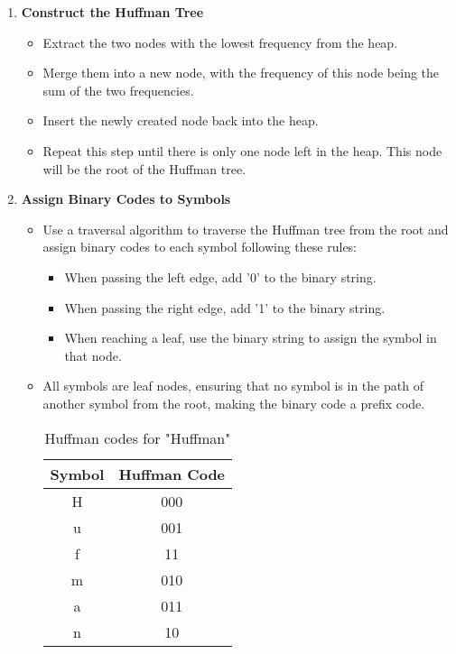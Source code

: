 \begin{enumerate}[label=\textbf{\Alph*.}]
    \item \textbf{Construct the Huffman Tree}  
    \begin{itemize}  
        \item Extract the two nodes with the lowest frequency from the heap.  
        \item Merge them into a new node, with the frequency of this node being the sum of the two frequencies.  
        \item Insert the newly created node back into the heap.  
        \item Repeat this step until there is only one node left in the heap. This node will be the root of the Huffman tree.  
    \end{itemize}  

    \item \textbf{Assign Binary Codes to Symbols}  
    \begin{itemize}  
        \item Use a traversal algorithm to traverse the Huffman tree from the root and assign binary codes to each symbol following these rules:  
        \begin{itemize}  
            \item When passing the left edge, add '0' to the binary string.  
            \item When passing the right edge, add '1' to the binary string.  
            \item When reaching a leaf, use the binary string to assign the symbol in that node.  
        \end{itemize}  
        \item All symbols are leaf nodes, ensuring that no symbol is in the path of another symbol from the root, making the binary code a prefix code.  
        
        \begin{table}[h!]  
        \centering  
        \begin{tabular}{|c|c|}  
        \hline  
        \rowcolor{gray!30}  
        Symbol & Huffman Code \\
        \hline  
        H & 000 \\
        u & 001 \\
        f & 11 \\
        m & 010 \\
        a & 011 \\
        n & 10 \\
        \hline  
        \end{tabular}  
        \caption{Huffman codes for "Huffman"}  
        \end{table}  
    \end{itemize}  


\end{enumerate}
